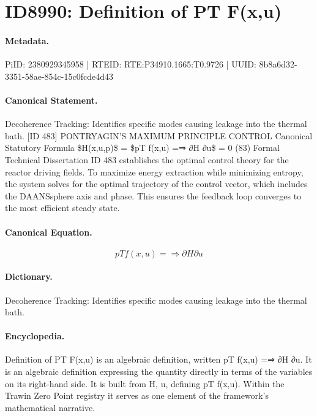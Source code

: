 \section*{ID8990: Definition of PT F(x,u)}
\paragraph{Metadata.}
PiID: 2380929345958 | RTEID: RTE:P34910.1665:T0.9726 | UUID: 8b8a6d32-3351-58ae-854c-15c0fcde4d43

\paragraph{Canonical Statement.}
Decoherence Tracking: Identifies specific modes causing leakage into the thermal bath. [ID 483] PONTRYAGIN’S MAXIMUM PRINCIPLE CONTROL Canonical Statutory Formula \$H(x,u,p)\$ = \$pT f(x,u) =⇒ ∂H ∂u\$ = 0 (83) Formal Technical Dissertation ID 483 establishes the optimal control theory for the reactor driving fields. To maximize energy extraction while minimizing entropy, the system solves for the optimal trajectory of the control vector, which includes the DAANSsphere axis and phase. This ensures the feedback loop converges to the most efficient steady state.

\paragraph{Canonical Equation.}
\[
pT f(x,u) =⇒ ∂H ∂u
\]

\paragraph{Dictionary.}
Decoherence Tracking: Identifies specific modes causing leakage into the thermal bath.

\paragraph{Encyclopedia.}
Definition of PT F(x,u) is an algebraic definition, written pT f(x,u) =⇒ ∂H ∂u. It is an algebraic definition expressing the quantity directly in terms of the variables on its right-hand side. It is built from H, u, defining pT f(x,u). Within the Trawin Zero Point registry it serves as one element of the framework's mathematical narrative.
